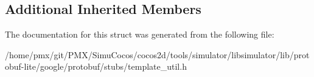 \subsection*{Additional Inherited Members}


The documentation for this struct was generated from the following file\+:\begin{DoxyCompactItemize}
\item 
/home/pmx/git/\+P\+M\+X/\+Simu\+Cocos/cocos2d/tools/simulator/libsimulator/lib/protobuf-\/lite/google/protobuf/stubs/template\+\_\+util.\+h\end{DoxyCompactItemize}
